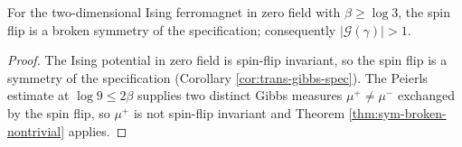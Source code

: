 \begin{example}
    \label{ex:sym-ising-breaking}
    \leanok

    For the two-dimensional Ising ferromagnet in zero field with $\beta \ge \log 3$, the spin
    flip is a broken symmetry of the specification; consequently $|\mathcal{G}(\gamma)| > 1$.
\end{example}
\begin{proof}
    \leanok

    The Ising potential in zero field is spin-flip invariant, so the spin flip is a symmetry of
    the specification (Corollary \ref{cor:trans-gibbs-spec}). The Peierls estimate at
    $\log 9 \le 2\beta$ supplies two distinct Gibbs measures $\mu^+ \neq \mu^-$ exchanged by the
    spin flip, so $\mu^+$ is not spin-flip invariant and
    Theorem \ref{thm:sym-broken-nontrivial} applies.
\end{proof}
